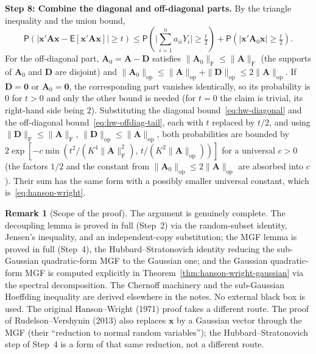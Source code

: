 \documentclass[12pt,a4paper]{article}
\makeatletter
\theoremstyle{definition}
\newtheorem{remark}[theorem]{Remark}
\renewenvironment{proof}[1][\proofname]{\par
  \pushQED{\qed}%
  \normalfont \topsep6\p@\@plus6\p@\relax
  \trivlist
  \item[\hskip\labelsep\bfseries #1\@addpunct{.}]\ignorespaces
}{%
  \popQED\endtrivlist\@endpefalse
}
\newcommand\expc{\mathsf{E}}
\newcommand\prb{\mathsf{P}}
\newcommand{\bx}{\mathbf{x}}
\newcommand{\bzero}{\mathbf{0}}
\newcommand{\bA}{\mathbf{A}}
\newcommand{\bD}{\mathbf{D}}
\newcommand{\opnorm}[1]{\|#1\|_{\mathrm{op}}}
\newcommand{\fnorm}[1]{\|#1\|_{\mathrm{F}}}
\makeatother
\begin{document}
\begin{proof}
\textbf{Step 8: Combine the diagonal and off-diagonal parts.} By the triangle inequality and the union bound,
\[
\prb\!\left(|\bx'\bA\bx - \expc[\bx'\bA\bx]| \geqslant t\right) \leqslant \prb\!\left(\Big|\sum_{i=1}^n a_{ii}Y_i\Big| \geqslant \tfrac{t}{2}\right) + \prb\!\left(|\bx'\bA_0\bx| \geqslant \tfrac{t}{2}\right).
\]
For the off-diagonal part, $\bA_0 = \bA - \bD$ satisfies $\fnorm{\bA_0} \leqslant \fnorm{\bA}$ (the supports of $\bA_0$ and $\bD$ are disjoint) and $\opnorm{\bA_0} \leqslant \opnorm{\bA} + \opnorm{\bD} \leqslant 2\opnorm{\bA}$. If $\bD = \bzero$ or $\bA_0 = \bzero$, the corresponding part vanishes identically, so its probability is $0$ for $t > 0$ and only the other bound is needed (for $t = 0$ the claim is trivial, its right-hand side being $2$). Substituting the diagonal bound~\eqref{eq:hw-diagonal} and the off-diagonal bound~\eqref{eq:hw-offdiag-tail}, each with $t$ replaced by $t/2$, and using $\fnorm{\bD} \leqslant \fnorm{\bA}$, $\opnorm{\bD} \leqslant \opnorm{\bA}$, both probabilities are bounded by $2\exp[-c\min(t^2/(K^4\fnorm{\bA}^2),\, t/(K^2\opnorm{\bA}))]$ for a universal $c > 0$ (the factors $1/2$ and the constant from $\opnorm{\bA_0} \leqslant 2\opnorm{\bA}$ are absorbed into $c$). Their sum has the same form with a possibly smaller universal constant, which is~\eqref{eq:hanson-wright}.
\end{proof}

\begin{remark}[Scope of the proof]
The argument is genuinely complete. The decoupling lemma is proved in full (Step~2) via the random-subset identity, Jensen's inequality, and an independent-copy substitution; the MGF lemma is proved in full (Step~4), the Hubbard--Stratonovich identity reducing the sub-Gaussian quadratic-form MGF to the Gaussian one; and the Gaussian quadratic-form MGF is computed explicitly in Theorem~\ref{thm:hanson-wright-gaussian} via the spectral decomposition. The Chernoff machinery and the sub-Gaussian Hoeffding inequality are derived elsewhere in the notes. No external black box is used. The original Hanson--Wright (1971) proof takes a different route. The proof of Rudelson--Vershynin (2013) also replaces $\bx$ by a Gaussian vector through the MGF (their ``reduction to normal random variables''); the Hubbard--Stratonovich step of Step~4 is a form of that same reduction, not a different route.
\end{remark}
\end{document}
